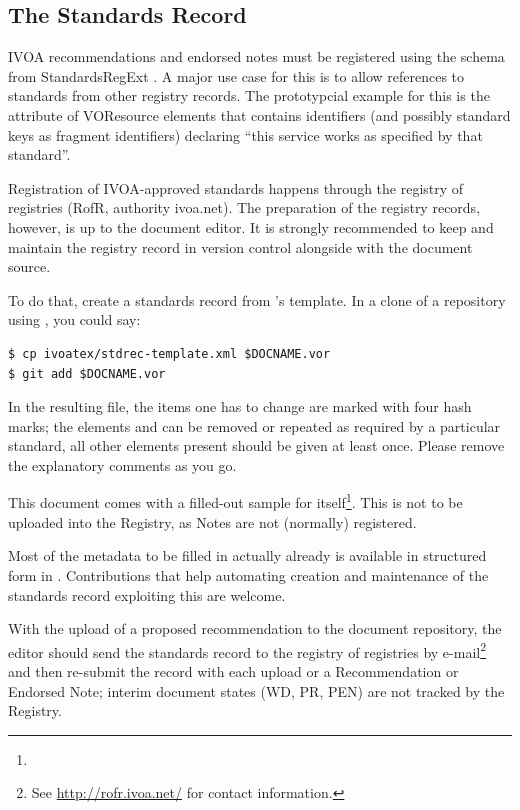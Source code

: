 \documentclass[11pt,a4paper]{ivoa}
\begin{document}
\subsection{The Standards Record}
\label{sect:stdrec}

IVOA recommendations and endorsed notes must be registered using the
schema from StandardsRegExt \citep{2012ivoa.spec.0508H}.  A major use
case for this is to allow references to standards from other registry
records. The prototypcial example for this is the 
attribute of VOResource  elements that contains
identifiers (and possibly standard keys as fragment identifiers)
declaring ``this service works as specified by that standard''.

Registration of IVOA-approved standards happens through the registry of
registries (RofR, authority ivoa.net).  The preparation of the registry
records, however, is up to the document editor.  It is strongly
recommended to keep and maintain the registry record in version control
alongside with the document source.

To do that, create a standards record from \ivoatex's template.  In a
clone of a repository using \ivoatex, you could say:

\begin{lstlisting}
$ cp ivoatex/stdrec-template.xml $DOCNAME.vor
$ git add $DOCNAME.vor
\end{lstlisting}

In the resulting file, the items one has to change are marked with four
hash marks; the elements  and  can be removed
or repeated as required by a particular standard, all other elements
present should be given at least once.  Please remove the explanatory
comments as you go.

This document comes with a filled-out sample for
itself\footnote{}.  This is
not to be uploaded into the Registry, as Notes are not (normally)
registered.

Most of the metadata to be filled in actually already is available in
structured form in \ivoatex.  Contributions that help automating
creation and maintenance of the standards record exploiting this are welcome.

With the upload of a proposed recommendation to the document repository,
the editor should send the standards record to the registry of
registries by e-mail\footnote{See \url{http://rofr.ivoa.net/} for
contact information.} and then re-submit the record with each upload or
a Recommendation or Endorsed Note; interim document states (WD, PR, PEN)
are not tracked by the Registry.
\end{document}
